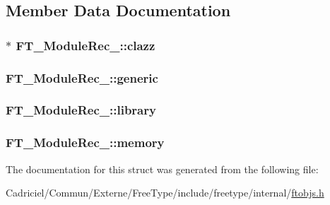 \subsection{Member Data Documentation}
\hypertarget{struct_f_t___module_rec___ac762573dc13af2d2af190a9e855742f5}{
\subsubsection[{clazz}]{$\ast$ F\-T\-\_\-\-Module\-Rec\-\_\-\-::clazz}}\label{struct_f_t___module_rec___ac762573dc13af2d2af190a9e855742f5}
\hypertarget{struct_f_t___module_rec___a860be13b9f239c42cacdbc5d6f81d44a}{
\subsubsection[{generic}]{ F\-T\-\_\-\-Module\-Rec\-\_\-\-::generic}}\label{struct_f_t___module_rec___a860be13b9f239c42cacdbc5d6f81d44a}
\hypertarget{struct_f_t___module_rec___ac3d04fbdc2988bf9a39f4ad6d3cb4b5f}{
\subsubsection[{library}]{ F\-T\-\_\-\-Module\-Rec\-\_\-\-::library}}\label{struct_f_t___module_rec___ac3d04fbdc2988bf9a39f4ad6d3cb4b5f}
\hypertarget{struct_f_t___module_rec___a33113e9eb2d6cd8ee6666da75ff8e108}{
\subsubsection[{memory}]{ F\-T\-\_\-\-Module\-Rec\-\_\-\-::memory}}\label{struct_f_t___module_rec___a33113e9eb2d6cd8ee6666da75ff8e108}


The documentation for this struct was generated from the following file\-:\begin{DoxyCompactItemize}
\item 
Cadriciel/\-Commun/\-Externe/\-Free\-Type/include/freetype/internal/\hyperlink{ftobjs_8h}{ftobjs.\-h}\end{DoxyCompactItemize}
